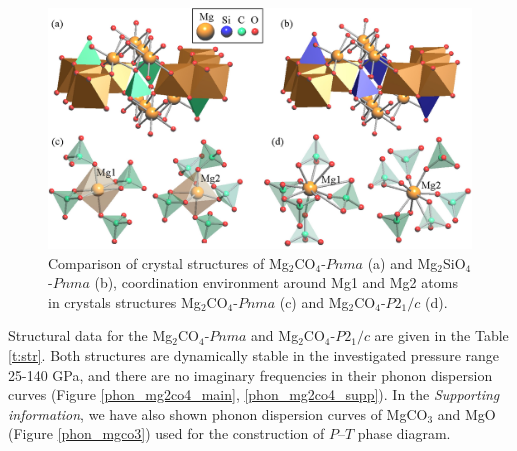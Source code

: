 \documentclass[a4paperm]{article}
\begin{document}
\begin{figure}[H]
	\includegraphics[width=\textwidth]{mg2co4_str} \centering
	\caption{Comparison of crystal structures of Mg$_2$CO$_4$-$Pnma$ (a) and Mg$_2$SiO$_4$-$Pnma$ (b), coordination environment around Mg1 and Mg2 atoms in crystals structures Mg$_2$CO$_4$-$Pnma$ (c) and Mg$_2$CO$_4$-$P2_1/c$ (d).} 	\label{str}
\end{figure}

Structural data for the Mg$_2$CO$_4$-$Pnma$ and Mg$_2$CO$_4$-$P2_1/c$ are given in the Table \ref{t:str}.
Both structures are dynamically stable in the investigated pressure range 25-140 GPa, and there are no imaginary frequencies in their phonon dispersion curves (Figure \ref{phon_mg2co4_main}, \ref{phon_mg2co4_supp}). In the {\it Supporting information}, we have also shown phonon dispersion curves of MgCO$_3$ and MgO (Figure \ref{phon_mgco3}) used for the construction of $P$--$T$ phase diagram.
\end{document}
